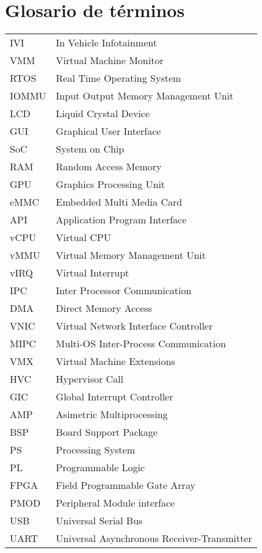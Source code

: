 \section{Glosario de términos}

\begin{tabular}{l l}
  IVI    & In Vehicle Infotainment \\
  VMM    & Virtual Machine Monitor \\
  RTOS   & Real Time Operating System \\
  IOMMU  & Input Output Memory Management Unit \\
  LCD    & Liquid Crystal Device \\
  GUI    & Graphical User Interface \\
  SoC    & System on Chip \\
  RAM    & Random Access Memory \\
  GPU    & Graphics Processing Unit \\
  eMMC   & Embedded Multi Media Card \\
  API    & Application Program Interface \\
  vCPU   & Virtual CPU \\
  vMMU   & Virtual Memory Management Unit \\
  vIRQ   & Virtual Interrupt \\
  IPC    & Inter Processor Communication \\
  DMA    & Direct Memory Access \\
  VNIC   & Virtual Network Interface Controller \\
  MIPC   & Multi-OS Inter-Process Communication \\
  VMX    & Virtual Machine Extensions \\
  HVC    & Hypervisor Call \\
  GIC    & Global Interrupt Controller \\
  AMP    & Asimetric Multiprocessing \\
  BSP    & Board Support Package \\
  PS     & Processing System \\
  PL     & Programmable Logic \\
  FPGA   & Field Programmable Gate Array \\
  PMOD   & Peripheral Module interface \\
  USB    & Universal Serial Bus \\
  UART   & Universal Asynchronous Receiver-Transmitter \\ 
\end{tabular}



\newpage
